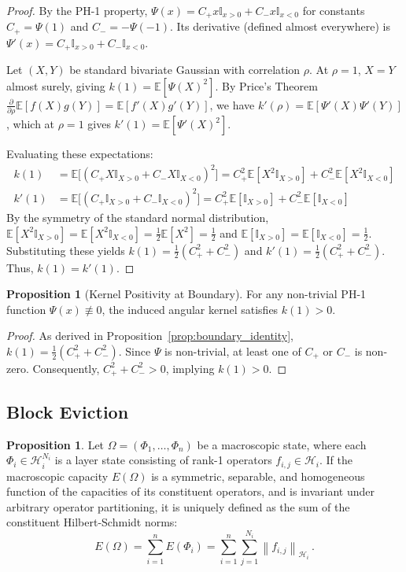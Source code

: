 \documentclass[11pt, a4paper, copyright, gdm]{google}
\newcommand{\norm}[1]{\left\lVert#1\right\rVert}
\newcommand{\calH}{\mathcal{H}}
\newcommand{\E}{\mathbb{E}}
\theoremstyle{definition}
\newtheorem{proposition}[theorem]{Proposition}
\begin{document}
\begin{proof}
By the PH-1 property, $\Psi(x) = C_+ x \mathbb{I}_{x>0} + C_- x \mathbb{I}_{x<0}$ for constants $C_+ = \Psi(1)$ and $C_- = -\Psi(-1)$. Its derivative (defined almost everywhere) is $\Psi'(x) = C_+ \mathbb{I}_{x>0} + C_- \mathbb{I}_{x<0}$.

Let $(X, Y)$ be standard bivariate Gaussian with correlation $\rho$. At $\rho=1$, $X=Y$ almost surely, giving $k(1) = \E[\Psi(X)^2]$. By Price's Theorem $\frac{\partial}{\partial \rho}\E[f(X)g(Y)] = \E[f'(X)g'(Y)]$, we have $k'(\rho) = \E[\Psi'(X)\Psi'(Y)]$, which at $\rho=1$ gives $k'(1) = \E[\Psi'(X)^2]$.

Evaluating these expectations:
\begin{align*}
    k(1) &= \E\big[ (C_+ X \mathbb{I}_{X>0} + C_- X \mathbb{I}_{X<0})^2 \big] = C_+^2 \E[X^2 \mathbb{I}_{X>0}] + C_-^2 \E[X^2 \mathbb{I}_{X<0}] \\
    k'(1) &= \E\big[ (C_+ \mathbb{I}_{X>0} + C_- \mathbb{I}_{X<0})^2 \big] = C_+^2 \E[\mathbb{I}_{X>0}] + C_-^2 \E[\mathbb{I}_{X<0}]
\end{align*}
By the symmetry of the standard normal distribution, $\E[X^2 \mathbb{I}_{X>0}] = \E[X^2 \mathbb{I}_{X<0}] = \frac{1}{2} \E[X^2] = \frac{1}{2}$ and $\E[\mathbb{I}_{X>0}] = \E[\mathbb{I}_{X<0}] = \frac{1}{2}$. Substituting these yields $k(1) = \frac{1}{2}(C_+^2 + C_-^2)$ and $k'(1) = \frac{1}{2}(C_+^2 + C_-^2)$. Thus, $k(1) = k'(1)$.
\end{proof}

\begin{proposition}[Kernel Positivity at Boundary]
\label{prop:kernel_positivity}
For any non-trivial PH-1 function $\Psi(x) \not\equiv 0$, the induced angular kernel satisfies $k(1) > 0$.
\end{proposition}

\begin{proof}
As derived in Proposition~\ref{prop:boundary_identity}, $k(1) = \frac{1}{2}(C_+^2 + C_-^2)$. Since $\Psi$ is non-trivial, at least one of $C_+$ or $C_-$ is non-zero. Consequently, $C_+^2 + C_-^2 > 0$, implying $k(1) > 0$.
\end{proof}

\subsection{Block Eviction}

\begin{proposition}
\label{prop:macro_capacity}
Let $\Omega = (\Phi_1, \dots, \Phi_n)$ be a macroscopic state, where each $\Phi_i \in \calH_i^{N_i}$ is a layer state consisting of rank-1 operators $f_{i,j} \in \calH_i$. If the macroscopic capacity $E(\Omega)$ is a symmetric, separable, and homogeneous function of the capacities of its constituent operators, and is invariant under arbitrary operator partitioning, it is uniquely defined as the sum of the constituent Hilbert-Schmidt norms:
\begin{equation}
E(\Omega) = \sum_{i=1}^n E(\Phi_i) = \sum_{i=1}^n \sum_{j=1}^{N_i} \norm{f_{i,j}}_{\calH_i} \,.
\end{equation}
\end{proposition}
\end{document}
